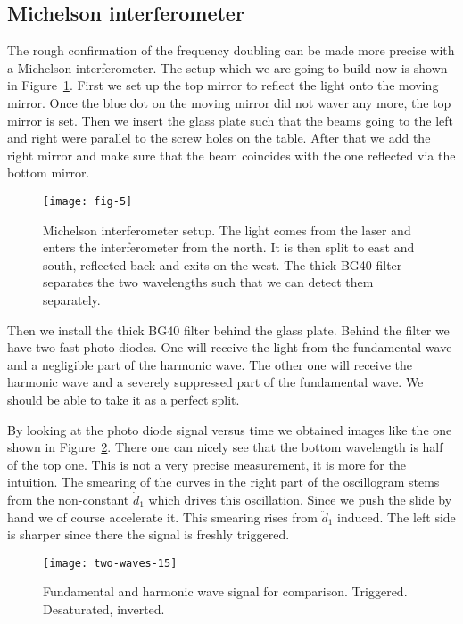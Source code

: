 \documentclass[11pt, english, fleqn, DIV=15, headinclude, BCOR=2cm]{scrreprt}
\begin{document}
\subsection{Michelson interferometer}

The rough confirmation of the frequency doubling can be made more precise with
a Michelson interferometer. The setup which we are going to build now is shown
in Figure~\ref{fig:fig-5}. First we set up the top mirror to reflect the light
onto the moving mirror. Once the blue dot on the moving mirror did not waver
any more, the top mirror is set. Then we insert the glass plate such that
the beams going to the left and right were parallel to the screw holes on the
table. After that we add the right mirror and make sure that the beam coincides
with the one reflected via the bottom mirror.

\begin{figure}
    \centering
    \texttt{[image: fig-5]}
    \caption{%
        Michelson interferometer setup. The light comes from the laser and
        enters the interferometer from the north. It is then split to east and
        south, reflected back and exits on the west. The thick BG40 filter
        separates the two wavelengths such that we can detect them separately.
        \parencite[Figure~5]{lab-course/doubling/manual}
    }
    \label{fig:fig-5}
\end{figure}

Then we install the thick BG40 filter behind the glass plate. Behind the filter
we have two fast photo diodes. One will receive the light from the fundamental
wave and a negligible part of the harmonic wave. The other one will receive the
harmonic wave and a severely suppressed part of the fundamental wave. We should
be able to take it as a perfect split.

By looking at the photo diode signal versus time we obtained images like the
one shown in Figure~\ref{fig:two-waves-15}. There one can nicely see that the
bottom wavelength is half of the top one. This is not a very precise
measurement, it is more for the intuition. The smearing of the curves in the
right part of the oscillogram stems from the non-constant $\dot d_1$ which
drives this oscillation. Since we push the slide by hand we of course
accelerate it. This smearing rises from $\ddot d_1$ induced. The left side is
sharper since there the signal is freshly triggered.

\begin{figure}
    \centering
    \texttt{[image: two-waves-15]}
    \caption{%
        Fundamental and harmonic wave signal for comparison. Triggered.
        Desaturated, inverted.
    }
    \label{fig:two-waves-15}
\end{figure}
\end{document}
